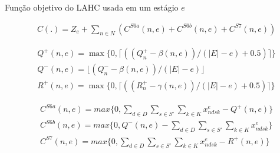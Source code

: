 \documentclass[8pt,mathserif,professionalfont]{beamer}
\begin{document}
\begin{frame}{Função objetivo do LAHC usada em um estágio $e$}

\begin{align}
& C(.) = Z_e + \sum_{n \in N} \left(C^{S6a}(n,e) +  C^{S6b}(n,e) +  C^{S7}(n,e) \right)   
\end{align}

\begin{align}
& Q^{+}(n,e) = \max\{0, \lceil (( Q^+_{n} - \beta(n,e)) / (|E|-e) + 0.5)\rceil\} \label{ests6a}\\
& Q^{-}(n,e) = \lfloor ( Q^-_{n} - \beta(n,e)) / (|E|-e) \rfloor   \label{ests6b} \\
&R^{+}(n,e) = \max\{0, \lceil (( R^+_{n} - \gamma(n,e)) / (|E|-e) +0.5)\rceil\}  \label{rs7}
\end{align}


\begin{align}
& C^{S6a}(n,e) = max\{0, \sum_{d \in D} \sum_{s \in S'}\sum_{k \in K} x^e_{ndsk} -  Q^{+}(n,e)\}  \label{cs6a}\\
& C^{S6b}(n,e) = max\{0,  Q^{-}(n,e) - \sum_{d \in D} \sum_{s \in S'}\sum_{k \in K} x^e_{ndsk}\}  \label{cs6b} \\
& C^{S7}(n,e) = max\{0, \sum_{d \in D} \sum_{s \in S'}\sum_{k \in K} x^e_{ndsk} -  R^{+}(n,e)\} 
\end{align}


\end{frame}
\end{document}
